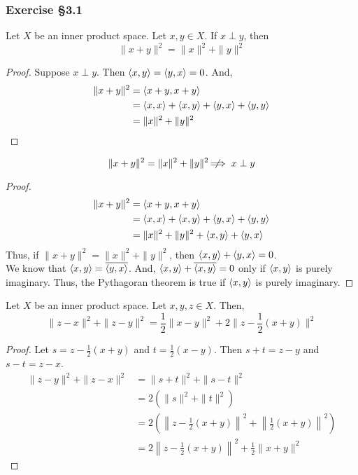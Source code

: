 \subsubsection*{Exercise \S3.1}
\begin{theorem}
	Let $X$ be an inner product space.
	Let $x,y \in X$.
	If $x \perp y$, then
	\[ \|x+y\|^2 = \|x\|^2 + \|y\|^2 \]
\end{theorem}
\begin{proof}
	Suppose $x \perp y$.
	Then $\left\langle x,y \right\rangle = \left\langle y,x \right\rangle = 0$.
	And,
	\begin{align*}
		\|x+y\|^2 
		& = \left\langle x+y,x+y \right\rangle \\
		& = \left\langle x,x \right\rangle + \left\langle x,y \right\rangle + \left\langle y,x \right\rangle + \left\langle y,y \right\rangle \\
		&  = \|x\|^2 + \|y\|^2
	\end{align*}
\end{proof}

\begin{remark}
	\[ \|x+y\|^2 = \|x\|^2 + \|y\|^2 \;\not\nobreak\!\!\!\!\implies x \perp y \]
\end{remark}
\begin{proof}
	\begin{align*}
		\|x+y\|^2 
		& = \left\langle x+y,x+y \right\rangle \\
		& = \left\langle x,x \right\rangle + \left\langle x,y \right\rangle + \left\langle y,x \right\rangle + \left\langle y,y \right\rangle \\
		& = \|x\|^2 + \|y\|^2 + \left\langle x,y \right\rangle + \left\langle y,x \right\rangle
	\end{align*}
	Thus, if $\|x+y\|^2 = \|x\|^2 + \|y\|^2$, then $\left\langle x,y \right\rangle + \left\langle y,x \right\rangle = 0$.\\

	We know that $\left\langle x,y \right\rangle = \overline{\left\langle y,x \right\rangle}$.
	And, $\left\langle x,y \right\rangle + \overline{\left\langle x,y \right\rangle} = 0$ only if $\left\langle x,y \right\rangle$ is purely imaginary.
	Thus, the Pythagoran theorem is true if $\left\langle x,y \right\rangle$ is purely imaginary.
\end{proof}

\begin{theorem}
	Let $X$ be an inner product space.
	Let $x,y,z \in X$.
	Then,
	\[ \|z-x\|^2 + \|z-y\|^2 = \frac{1}{2} \|x-y\|^2 + 2\|z - \frac{1}{2}(x+y)\|^2 \]
\end{theorem}
\begin{proof}
	Let $s = z-\frac{1}{2}(x+y)$ and $t = \frac{1}{2}(x-y)$.
	Then $s+t = z-y$ and $s-t = z-x$.
	\begin{align*}
		\|z-y\|^2 + \|z-x\|^2 
		& = \|s+t\|^2 + \|s-t\|^2  \\
		& = 2(\|s\|^2 + \|t\|^2) \\
		& = 2\left(\left\|z-\frac{1}{2}(x+y)\right\|^2 + \left\|\frac{1}{2}(x+y)\right\|^2\right) \\
		& = 2\left\|z-\frac{1}{2}(x+y)\right\|^2 + \frac{1}{2} \|x+y\|^2
	\end{align*}
\end{proof}

